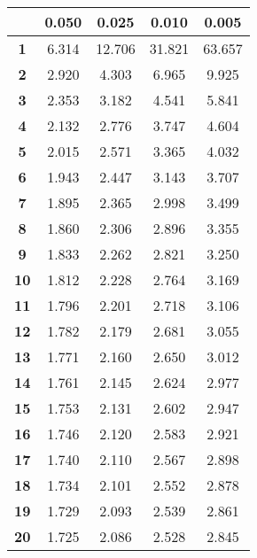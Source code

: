 \noindent\begin{tabular}{*{5}{|c}|}
    \hline
     & \textbf{0.050} & \textbf{0.025} & \textbf{0.010} & \textbf{0.005} \\
    \hline 
\textbf{1} & 6.314 &12.706 &31.821 &63.657 \\
\hline 
\textbf{2} & 2.920 &4.303 &6.965 &9.925 \\
\hline 
\textbf{3} & 2.353 &3.182 &4.541 &5.841 \\
\hline 
\textbf{4} & 2.132 &2.776 &3.747 &4.604 \\
\hline 
\textbf{5} & 2.015 &2.571 &3.365 &4.032 \\
\hline 
\textbf{6} & 1.943 &2.447 &3.143 &3.707 \\
\hline 
\textbf{7} & 1.895 &2.365 &2.998 &3.499 \\
\hline 
\textbf{8} & 1.860 &2.306 &2.896 &3.355 \\
\hline 
\textbf{9} & 1.833 &2.262 &2.821 &3.250 \\
\hline 
\textbf{10} & 1.812 &2.228 &2.764 &3.169 \\
\hline 
\textbf{11} & 1.796 &2.201 &2.718 &3.106 \\
\hline 
\textbf{12} & 1.782 &2.179 &2.681 &3.055 \\
\hline 
\textbf{13} & 1.771 &2.160 &2.650 &3.012 \\
\hline 
\textbf{14} & 1.761 &2.145 &2.624 &2.977 \\
\hline 
\textbf{15} & 1.753 &2.131 &2.602 &2.947 \\
\hline 
\textbf{16} & 1.746 &2.120 &2.583 &2.921 \\
\hline 
\textbf{17} & 1.740 &2.110 &2.567 &2.898 \\
\hline 
\textbf{18} & 1.734 &2.101 &2.552 &2.878 \\
\hline 
\textbf{19} & 1.729 &2.093 &2.539 &2.861 \\
\hline 
\textbf{20} & 1.725 &2.086 &2.528 &2.845 \\
\hline 
\end{tabular} 

